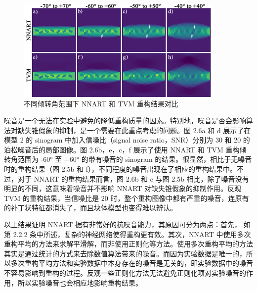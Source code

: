 \begin{figure}[htbp]
	\vspace{\baselineskip}
	\centering
	\includegraphics[width=0.9\textwidth]{../3.5/35}
	\caption{不同倾转角范围下 NNART 和 TVM 重构结果对比}\label{fig:35}
	\song{}
\end{figure}

噪音是一个无法在实验中避免的降低重构质量的因素。特别地，噪音是否会影响算法对缺失锥假象的抑制，是一个需要在此重点考虑的问题。图 2.6a 和 d 展示了在模型 2 的 sinogram 中加入信噪比（signal noise ratio，SNR）分别为 30 和 20 的泊松噪音后的局部图像。图 2.6b，e，c，f 展示了使用 NNART 和 TVM 重构倾转角范围为 -60° 至 +60° 的带有噪音的 sinogram 的结果。很显然，相比于无噪音时的重构结果（图 2.5b 和 f），不同程度的噪音出现在了相应的重构结果中。不过，对于 NNART 的重构结果而言，图 2.6b 和 e 与图 2.5b 相比，除了噪音没有明显的不同，这意味着噪音并不影响 NNART 对缺失锥假象的抑制作用。反观 TVM 的重构结果，当信噪比是 20 时，整个重构图像中都有严重的噪音，连原有的补丁状特征都消失了，而且块体模型也变得难以辨认。

以上结果证明 NNART 据有非常好的抗噪音能力，其原因可分为两点：首先，
如第 2.2.2 条中所述，复杂的神经网络使得重构更有效。其次，NNART 中使用多次重构平均的方法来求解平滑解，而非使用正则化等方法。使用多次重构平均的方法其实是通过统计的方式来去除数值算法带来的噪音。而因为实验数据是唯一的，所以多次重构平均方法和实验数据中本身存在的噪音是无关的，即实验数据中的噪音不容易影响到重构的过程。反观一些正则化方法无法避免正则化项对实验噪音的作用，所以实验噪音也会相应地影响重构结果。

